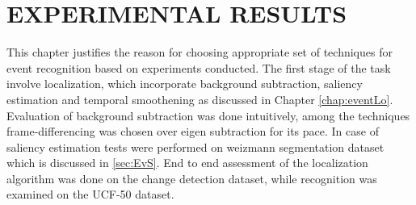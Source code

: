 \chapter{EXPERIMENTAL RESULTS}
\label{chap:exp}
This chapter justifies the reason for choosing appropriate set of techniques for event recognition based on  experiments conducted. The first stage of the task involve localization, which incorporate background subtraction, saliency estimation and temporal smoothening as discussed in Chapter \ref{chap:eventLo}. Evaluation of background subtraction was done intuitively, among the techniques frame-differencing was chosen over eigen subtraction for its pace. In case of saliency estimation tests were performed on weizmann segmentation dataset which is discussed in \ref{sec:EvS}. End to end assessment of the localization algorithm was done on the change detection dataset, while recognition was examined on the UCF-50 dataset.

